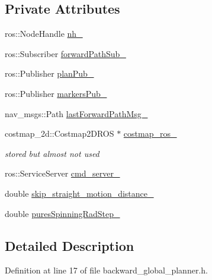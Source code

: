 \subsection*{Private Attributes}
\begin{DoxyCompactItemize}
\item 
ros\+::\+Node\+Handle \hyperlink{classbackward__global__planner_1_1BackwardGlobalPlanner_a4e828d988f4c66711e3144d210d2f80a}{nh\+\_\+}
\item 
ros\+::\+Subscriber \hyperlink{classbackward__global__planner_1_1BackwardGlobalPlanner_ac4f74dedbfaa1034fa4cffa6d27640e7}{forward\+Path\+Sub\+\_\+}
\item 
ros\+::\+Publisher \hyperlink{classbackward__global__planner_1_1BackwardGlobalPlanner_ad51fd6aecf673a500ec828b796d68228}{plan\+Pub\+\_\+}
\item 
ros\+::\+Publisher \hyperlink{classbackward__global__planner_1_1BackwardGlobalPlanner_a02e3724cf09622d3f107e3476040add4}{markers\+Pub\+\_\+}
\item 
nav\+\_\+msgs\+::\+Path \hyperlink{classbackward__global__planner_1_1BackwardGlobalPlanner_a2fe940d13931d4e6e27e3c3d5e5a7db8}{last\+Forward\+Path\+Msg\+\_\+}
\item 
costmap\+\_\+2d\+::\+Costmap2\+D\+R\+OS $\ast$ \hyperlink{classbackward__global__planner_1_1BackwardGlobalPlanner_afacbfb009c468d3c47959ca413eb6606}{costmap\+\_\+ros\+\_\+}
\begin{DoxyCompactList}\small\item\em stored but almost not used \end{DoxyCompactList}\item 
ros\+::\+Service\+Server \hyperlink{classbackward__global__planner_1_1BackwardGlobalPlanner_a7d9647a5c5e35794af7ebc14827f5b35}{cmd\+\_\+server\+\_\+}
\item 
double \hyperlink{classbackward__global__planner_1_1BackwardGlobalPlanner_a307c9795c48fa4f6232cf8333704f27f}{skip\+\_\+straight\+\_\+motion\+\_\+distance\+\_\+}
\item 
double \hyperlink{classbackward__global__planner_1_1BackwardGlobalPlanner_aaf07dcf11683d0c3e9df474d82a16468}{pures\+Spinning\+Rad\+Step\+\_\+}
\end{DoxyCompactItemize}


\subsection{Detailed Description}


Definition at line 17 of file backward\+\_\+global\+\_\+planner.\+h.



